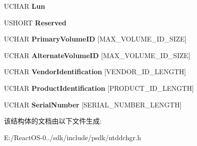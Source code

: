 \begin{DoxyCompactItemize}
U\+C\+H\+AR {\bfseries Lun}
\item 
\mbox{\label{struct___c_h_a_n_g_e_r___e_l_e_m_e_n_t___s_t_a_t_u_s___e_x_a50bc3ea7135c607b560126624a3b484f}} 
U\+S\+H\+O\+RT {\bfseries Reserved}
\item 
\mbox{\label{struct___c_h_a_n_g_e_r___e_l_e_m_e_n_t___s_t_a_t_u_s___e_x_a0959602c100d8da11e17cad9108d9a51}} 
U\+C\+H\+AR {\bfseries Primary\+Volume\+ID} \mbox{[}M\+A\+X\+\_\+\+V\+O\+L\+U\+M\+E\+\_\+\+I\+D\+\_\+\+S\+I\+ZE\mbox{]}
\item 
\mbox{\label{struct___c_h_a_n_g_e_r___e_l_e_m_e_n_t___s_t_a_t_u_s___e_x_a19c55737c7856e7a6f29ff05d9d26b39}} 
U\+C\+H\+AR {\bfseries Alternate\+Volume\+ID} \mbox{[}M\+A\+X\+\_\+\+V\+O\+L\+U\+M\+E\+\_\+\+I\+D\+\_\+\+S\+I\+ZE\mbox{]}
\item 
\mbox{\label{struct___c_h_a_n_g_e_r___e_l_e_m_e_n_t___s_t_a_t_u_s___e_x_abb3ff51f28bfd4c5d33d2fb2a4663ae7}} 
U\+C\+H\+AR {\bfseries Vendor\+Identification} \mbox{[}V\+E\+N\+D\+O\+R\+\_\+\+I\+D\+\_\+\+L\+E\+N\+G\+TH\mbox{]}
\item 
\mbox{\label{struct___c_h_a_n_g_e_r___e_l_e_m_e_n_t___s_t_a_t_u_s___e_x_a15db5eacb8255c3ff624274de0c8856f}} 
U\+C\+H\+AR {\bfseries Product\+Identification} \mbox{[}P\+R\+O\+D\+U\+C\+T\+\_\+\+I\+D\+\_\+\+L\+E\+N\+G\+TH\mbox{]}
\item 
\mbox{\label{struct___c_h_a_n_g_e_r___e_l_e_m_e_n_t___s_t_a_t_u_s___e_x_a78dce834f50e5ca4ec4d07a7846244d0}} 
U\+C\+H\+AR {\bfseries Serial\+Number} \mbox{[}S\+E\+R\+I\+A\+L\+\_\+\+N\+U\+M\+B\+E\+R\+\_\+\+L\+E\+N\+G\+TH\mbox{]}
\end{DoxyCompactItemize}


该结构体的文档由以下文件生成\+:\begin{DoxyCompactItemize}
\item 
E\+:/\+React\+O\+S-\/0../sdk/include/psdk/ntddchgr.\+h\end{DoxyCompactItemize}
